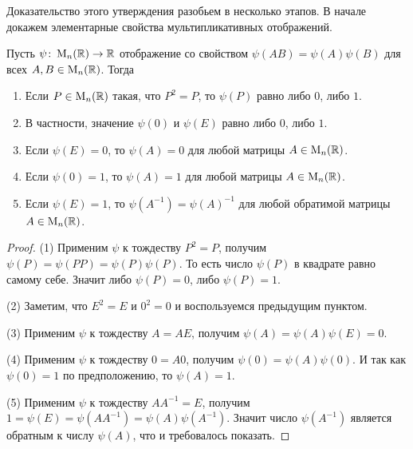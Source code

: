 Доказательство этого утверждения разобьем в несколько этапов.
В начале докажем элементарные свойства мультипликативных отображений.

\begin{claim}
Пусть $\psi\colon \operatorname{M}_{n}(\mathbb R)\to \mathbb R$ отображение со свойством $\psi(AB) = \psi(A)\psi(B)$ для всех $A,B\in\operatorname{M}_{n}(\mathbb R)$.
Тогда
\begin{enumerate}
\item Если $P\in \operatorname{M}_{n}(\mathbb R)$ такая, что $P^2 = P$, то $\psi(P)$ равно либо $0$, либо $1$.

\item В частности, значение $\psi(0)$ и $\psi(E)$ равно либо $0$, либо $1$.

\item Если $\psi(E) = 0$, то $\psi(A) = 0$ для любой матрицы $A\in\operatorname{M}_{n}(\mathbb R)$.

\item Если $\psi(0) = 1$, то $\psi(A) = 1$ для любой матрицы $A\in\operatorname{M}_{n}(\mathbb R)$.

\item Если $\psi(E) = 1$, то $\psi(A^{-1}) = \psi(A)^{-1}$ для любой обратимой матрицы $A\in\operatorname{M}_{n}(\mathbb R)$.
\end{enumerate}
\end{claim}
\begin{proof}

(1) Применим $\psi$ к тождеству $P^2 = P$, получим $\psi(P) = \psi(P P) = \psi(P)\psi(P)$.
То есть число $\psi(P)$ в квадрате равно самому себе.
Значит либо $\psi(P) = 0$, либо $\psi(P) = 1$.

(2) Заметим, что $E^2 = E$ и $0^2 = 0$ и воспользуемся предыдущим пунктом.

(3) Применим $\psi$ к тождеству $A = A E$, получим $\psi(A) = \psi(A)\psi(E) = 0$.

(4) Применим $\psi$ к тождеству $0 = A 0$, получим $\psi(0) = \psi(A) \psi(0)$.
И так как $\psi(0) =1$ по предположению, то $\psi(A) = 1$.

(5) Применим $\psi$ к тождеству $A A^{-1} = E$, получим $1 = \psi(E) = \psi(AA^{-1})=\psi(A)\psi(A^{-1})$.
Значит число $\psi(A^{-1})$ является обратным к числу $\psi(A)$, что и требовалось показать.
\end{proof}

